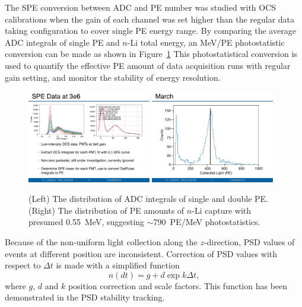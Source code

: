 The SPE conversion between ADC and PE number was studied with OCS calibrations when the gain of each channel was set higher than the regular data taking configuration to cover single PE energy range.
By comparing the average ADC integrals of single PE and $n$-Li total energy, an MeV/PE photostatistic conversion can be made as shown in Figure~\ref{fig:SPE}
This photostatistical conversion is used to quantify the effective PE amount of data acquisition runs with regular gain setting, and monitor the stability of energy resolution.
\begin{figure}[h!]
\centering
\includegraphics[width=0.48\textwidth]{Figures/SPEADC.pdf}
\includegraphics[width=0.48\textwidth]{Figures/SPEnLi.pdf}
\caption[The single PE calibration for photostatistics] {
(Left) The distribution of ADC integrals of single and double PE.
(Right) The distribution of PE amounts of $n$-Li capture with presumed 0.55~MeV, suggesting $\sim$790~PE/MeV photostatistics.
}
\label{fig:SPE}
\end{figure}


Because of the non-uniform light collection along the $z$-direction, PSD values of events at different position are inconsistent.
Correction of PSD values with respect to $\Delta t$ is made with a simplified function
\begin{equation}
n(dt) = g+d\exp{k \Delta t},
\end{equation}
where $g$, $d$ and $k$ position correction and scale factors.
This function has been demonstrated in the PSD stability tracking.

